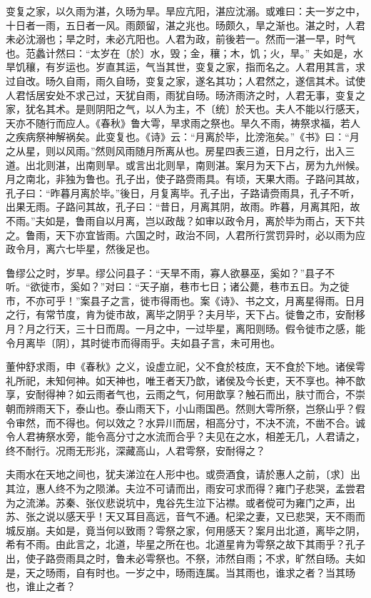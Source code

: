 \documentclass[]{article}
\begin{document}
变复之家，以久雨为湛，久旸为旱。旱应亢阳，湛应沈溺。或难曰：夫一岁之中，十日者一雨，五日者一风。雨颇留，湛之兆也。旸颇久，旱之渐也。湛之时，人君未必沈溺也；旱之时，未必亢阳也。人君为政，前後若一。然而一湛一早，时气也。范蠡计然曰：``太岁在〔於〕水，毁；金，穰；木，饥；火，旱。''
夫如是，水旱饥穰，有岁运也。岁直其运，气当其世，变复之家，指而名之。人君用其言，求过自改。旸久自雨，雨久自旸，变复之家，遂名其功；人君然之，遂信其术。试使人君恬居安处不求己过，天犹自雨，雨犹自旸。旸济雨济之时，人君无事，变复之家，犹名其术。是则阴阳之气，以人为主，不〔统〕於天也。夫人不能以行感天，天亦不随行而应人。《春秋》鲁大雩，旱求雨之祭也。旱久不雨，祷祭求福，若人之疾病祭神解祸矣。此变复也。《诗》云：``月离於毕，比滂沲矣。''《书》曰：``月之从星，则以风雨。''然则风雨随月所离从也。房星四表三道，日月之行，出入三道。出北则湛，出南则旱。或言出北则旱，南则湛。案月为天下占，房为九州候。月之南北，非独为鲁也。孔子出，使子路赍雨具。有顷，天果大雨。子路问其故，孔子曰：``昨暮月离於毕。''後日，月复离毕。孔子出，子路请赍雨具，孔子不听，出果无雨。子路问其故，孔子曰：``昔日，月离其阴，故雨。昨暮，月离其阳，故不雨。''夫如是，鲁雨自以月离，岂以政哉？如审以政令月，离於毕为雨占，天下共之。鲁雨，天下亦宜皆雨。六国之时，政治不同，人君所行赏罚异时，必以雨为应政令月，离六七毕星，然後足也。

鲁缪公之时，岁旱。缪公问县子：``天旱不雨，寡人欲暴巫，奚如？''县子不听。``欲徙市，奚如？''对曰：``天子崩，巷市七日；诸公薨，巷市五日。为之徙市，不亦可乎！''案县子之言，徙市得雨也。案《诗》、书之文，月离星得雨。日月之行，有常节度，肯为徙市故，离毕之阴乎？夫月毕，天下占。徙鲁之市，安耐移月？月之行天，三十日而周。一月之中，一过毕星，离阳则旸。假令徙市之感，能令月离毕〔阴〕，其时徙市而得雨乎。夫如县子言，未可用也。

董仲舒求雨，申《春秋》之义，设虚立祀，父不食於枝庶，天不食於下地。诸侯雩礼所祀，未知何神。如天神也，唯王者天乃歆，诸侯及今长吏，天不享也。神不歆享，安耐得神？如云雨者气也，云雨之气，何用歆享？触石而出，肤寸而合，不崇朝而辨雨天下，泰山也。泰山雨天下，小山雨国邑。然则大雩所祭，岂祭山乎？假令审然，而不得也。何以效之？水异川而居，相高分寸，不决不流，不凿不合。诚令人君祷祭水旁，能令高分寸之水流而合乎？夫见在之水，相差无几，人君请之，终不耐行。况雨无形兆，深藏高山，人君雩祭，安耐得之？

夫雨水在天地之间也，犹夫涕泣在人形中也。或赍酒食，请於惠人之前，〔求〕出其泣，惠人终不为之陨涕。夫泣不可请而出，雨安可求而得？雍门子悲哭，孟尝君为之流涕。苏秦、张仪悲说坑中，鬼谷先生泣下沾襟。或者傥可为雍门之声，出苏、张之说以感天乎！天又耳目高远，音气不通。杞梁之妻，又已悲哭，天不雨而城反崩。夫如是，竟当何以致雨？雩祭之家，何用感天？案月出北道，离毕之阴，希有不雨。由此言之，北道，毕星之所在也。北道星肯为雩祭之故下其雨乎？孔子出，使子路赍雨具之时，鲁未必雩祭也。不祭，沛然自雨；不求，旷然自旸。夫如是，天之旸雨，自有时也。一岁之中，旸雨连属。当其雨也，谁求之者？当其旸也，谁止之者？
\end{document}
